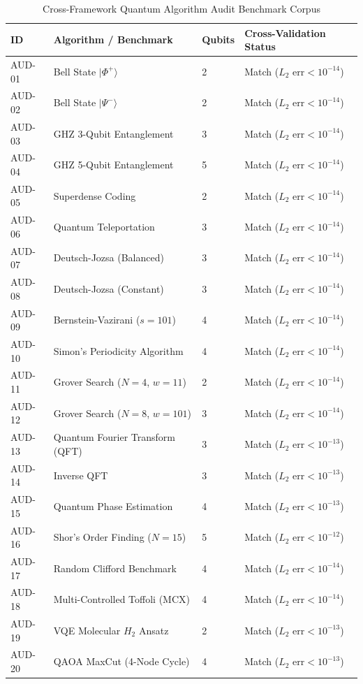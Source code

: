 \begin{table}[h!]
\centering
\caption{Cross-Framework Quantum Algorithm Audit Benchmark Corpus}
\label{tab:audit_corpus}
\begin{tabular}{|p{1.5cm}|p{4.5cm}|p{2cm}|p{4cm}|}
\hline
\textbf{ID} & \textbf{Algorithm / Benchmark} & \textbf{Qubits} & \textbf{Cross-Validation Status} \\
\hline
AUD-01 & Bell State $|\Phi^+\rangle$ & 2 & Match ($L_2 \text{ err} < 10^{-14}$) \\
\hline
AUD-02 & Bell State $|\Psi^-\rangle$ & 2 & Match ($L_2 \text{ err} < 10^{-14}$) \\
\hline
AUD-03 & GHZ 3-Qubit Entanglement & 3 & Match ($L_2 \text{ err} < 10^{-14}$) \\
\hline
AUD-04 & GHZ 5-Qubit Entanglement & 5 & Match ($L_2 \text{ err} < 10^{-14}$) \\
\hline
AUD-05 & Superdense Coding & 2 & Match ($L_2 \text{ err} < 10^{-14}$) \\
\hline
AUD-06 & Quantum Teleportation & 3 & Match ($L_2 \text{ err} < 10^{-14}$) \\
\hline
AUD-07 & Deutsch-Jozsa (Balanced) & 3 & Match ($L_2 \text{ err} < 10^{-14}$) \\
\hline
AUD-08 & Deutsch-Jozsa (Constant) & 3 & Match ($L_2 \text{ err} < 10^{-14}$) \\
\hline
AUD-09 & Bernstein-Vazirani ($s=101$) & 4 & Match ($L_2 \text{ err} < 10^{-14}$) \\
\hline
AUD-10 & Simon's Periodicity Algorithm & 4 & Match ($L_2 \text{ err} < 10^{-14}$) \\
\hline
AUD-11 & Grover Search ($N=4$, $w=11$) & 2 & Match ($L_2 \text{ err} < 10^{-14}$) \\
\hline
AUD-12 & Grover Search ($N=8$, $w=101$) & 3 & Match ($L_2 \text{ err} < 10^{-14}$) \\
\hline
AUD-13 & Quantum Fourier Transform (QFT) & 3 & Match ($L_2 \text{ err} < 10^{-13}$) \\
\hline
AUD-14 & Inverse QFT & 3 & Match ($L_2 \text{ err} < 10^{-13}$) \\
\hline
AUD-15 & Quantum Phase Estimation & 4 & Match ($L_2 \text{ err} < 10^{-13}$) \\
\hline
AUD-16 & Shor's Order Finding ($N=15$) & 5 & Match ($L_2 \text{ err} < 10^{-12}$) \\
\hline
AUD-17 & Random Clifford Benchmark & 4 & Match ($L_2 \text{ err} < 10^{-14}$) \\
\hline
AUD-18 & Multi-Controlled Toffoli (MCX) & 4 & Match ($L_2 \text{ err} < 10^{-14}$) \\
\hline
AUD-19 & VQE Molecular $H_2$ Ansatz & 2 & Match ($L_2 \text{ err} < 10^{-13}$) \\
\hline
AUD-20 & QAOA MaxCut (4-Node Cycle) & 4 & Match ($L_2 \text{ err} < 10^{-13}$) \\
\hline
\end{tabular}
\end{table}

